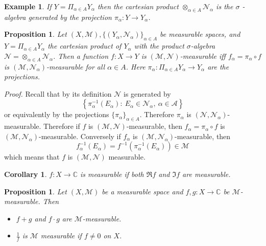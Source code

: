 \documentclass[12pt]{report}
\newtheorem{corollary}[theorem]{Corollary}
\newtheorem{prop}[theorem]{Proposition}
\newtheorem{example}[theorem]{Example}
\begin{document}
\begin{example} If $Y = \Pi_{\alpha \in A} Y_\alpha$ then the
cartesian product 
$\otimes_{\alpha \in A} \mathcal{N}_\alpha$ is the $\sigma$
-algebra generated by the projection $\pi_\alpha: Y
\longrightarrow Y_\alpha$.
\end{example}

\begin{prop}   Let $(X, \mathcal{M}), \{(Y_\alpha,
\mathcal{N}_\alpha)\}_{\alpha \in A}$ be measurable spaces, and $Y =
\Pi_{\alpha \in A} Y_\alpha$ the cartesian product of $Y_\alpha$ with
the product 
$ \sigma$-algebra $\mathcal{N} = \otimes_{\alpha\in A}
\mathcal{N}_\alpha$.  Then a function
 $f: X\longrightarrow Y$ is $(\mathcal{M}, \mathcal{N})$-measurable iff 
$f_\alpha =
\pi_\alpha \circ f$  is $ (\mathcal{M}, \mathcal{N}_\alpha)$-measurable
for all
$\alpha \in A$.  Here $\pi_\alpha: \Pi_{\alpha \in A} Y_\alpha
\longrightarrow Y_\alpha$ are the projections.
\end{prop}


\bigskip
\noindent
{\em Proof.}  Recall that by its definition $\mathcal{N}$ is
generated by
\[
\left \{ \pi^{-1}_\alpha (E_\alpha): \ E_\alpha \in \mathcal{N}_\alpha, \
\alpha \in
\mathcal{A} \right \}
\]
or equivalently by the projections $\{\pi_\alpha \}_{\alpha \in
A}$.  Therefore
$\pi_\alpha$ is $(\mathcal{N}, \mathcal{N}_\alpha)$-measurable. 
Therefore if $f$ is
$(\mathcal{M}, \mathcal{N})$-measurable, then $f_\alpha = \pi_\alpha
\circ f$ is
$(\mathcal{M}, \mathcal{N}_\alpha)$-measurable.  Conversely if
$f_\alpha$ is
$(\mathcal{M}, \mathcal{N}_\alpha)$-measurable, then
\[ f^{-1}_\alpha (E_\alpha) = f^{-1} (\pi^{-1}_\alpha (E_\alpha)) \in
\mathcal{M}
\] which means that $f$ is $(\mathcal{M}, \mathcal{N})$ measurable.

\begin{corollary}  $f: X\longrightarrow \mathbb{C}$ is
measurable if both $\Re f$ and $\Im f$ are measurable.
\end{corollary}

\begin{prop}  Let $(X, \mathcal{M})$ be a
measurable space and $f, g: X\longrightarrow \mathbb{C}$ be $
\mathcal{M}$-measurable.
Then
\begin{itemize}
\item[(a)]  $f + g$ and $f \cdot g$ are
$\mathcal{M}$-measurable.
\item[(b)] $\frac{1}{f}$ is $\mathcal{M}$ measurable if $f
\ne 0$ on $X$.
\end{itemize}
\end{prop}
\end{document}
